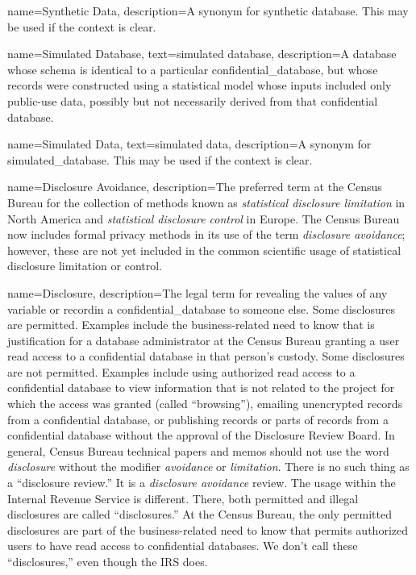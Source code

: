 {
    name=Synthetic Data,
    description={A synonym for synthetic database. This may be used if the context is clear.}
}

{
    name=Simulated Database,
    text=simulated database,
    description={A \gls{database} whose schema is identical to a particular \gls{confidential_database}, but whose \glspl{record} were constructed using a statistical model whose inputs included only public-use data, possibly but not necessarily derived from that confidential database.}
}

{
    name=Simulated Data,
    text=simulated data,
    description={A synonym for \gls{simulated_database}. This may be used if the context is clear.}
}

{
    name=Disclosure Avoidance,
    description={The preferred term at the Census Bureau for the collection of methods known as \emph{statistical disclosure limitation} in North America and \emph{statistical disclosure control} in Europe. The Census Bureau now includes formal privacy methods in its use of the term \textit{disclosure avoidance}; however, these are not yet included in the common scientific usage of statistical disclosure limitation or control.}
}

{
    name=Disclosure,
    description={The legal term for revealing the values of any variable or \gls{record}in a \gls{confidential_database} to someone else. Some disclosures are permitted. Examples include the business-related need to know that is justification for a database administrator at the Census Bureau granting a user read access to a confidential database in that person's custody. \newline \newline Some disclosures are not permitted. Examples include using authorized read access to a confidential database to view information that is not related to the project for which the access was granted (called ``browsing''), emailing unencrypted \glspl{record} from a confidential database, or publishing records or parts of records from a confidential database without the approval of the Disclosure Review Board. In general, Census Bureau technical papers and memos should not use the word \textit{disclosure} without the modifier \textit{avoidance} or \textit{limitation}. There is no such thing as a ``disclosure review.'' It is a \textit{disclosure avoidance} review. The usage within the Internal Revenue Service is different. There, both permitted and illegal disclosures are called ``disclosures.'' At the Census Bureau, the only permitted disclosures are part of the business-related need to know that permits authorized users to have read access to confidential databases. We don't call these ``disclosures,'' even though the IRS does.}
}


